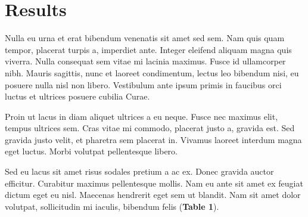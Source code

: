 \documentclass[12pt,letterpaper]{article}
\begin{document}
\section{Results}
Nulla eu urna et erat bibendum venenatis sit amet sed sem. Nam quis quam tempor,
placerat turpis a, imperdiet ante. Integer eleifend aliquam magna quis viverra. Nulla
consequat sem vitae mi lacinia maximus. Fusce id ullamcorper nibh. Mauris sagittis,
nunc et laoreet condimentum, lectus leo bibendum nisi, eu posuere nulla nisl non
libero. Vestibulum ante ipsum primis in faucibus orci luctus et ultrices posuere
cubilia Curae.

Proin ut lacus in diam aliquet ultrices a eu neque. Fusce nec maximus elit, tempus
ultrices sem. Cras vitae mi commodo, placerat justo a, gravida est. Sed gravida justo
velit, et pharetra sem placerat in. Vivamus laoreet interdum magna eget luctus. Morbi
volutpat pellentesque libero.

Sed eu lacus sit amet risus sodales pretium a ac ex. Donec gravida auctor efficitur.
Curabitur maximus pellentesque mollis. Nam eu ante sit amet ex feugiat dictum eget eu
nisl. Maecenas hendrerit eget sem ut blandit. Nam sit amet dolor volutpat, sollicitudin
mi iaculis, bibendum felis (\textbf{Table 1}).
\end{document}
